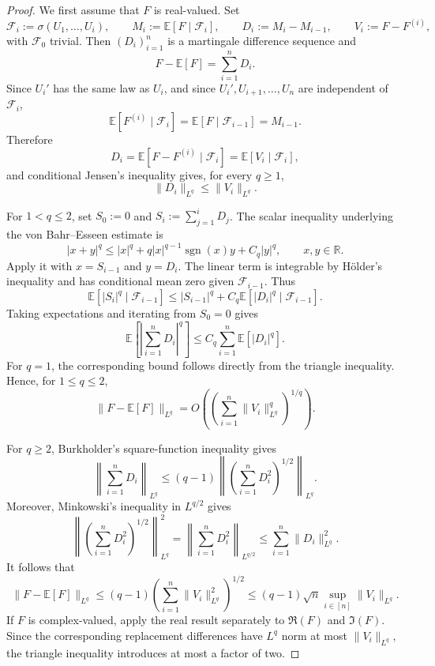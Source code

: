 \documentclass[EJP, preprint, NODS, nobera, nofontexpansion]{ejpecp}
\begin{document}
\begin{proof}
We first assume that $F$ is real-valued. Set
\[
    \mathcal F_i:=\sigma(U_1,\ldots,U_i),
    \qquad
    M_i:=\mathbb E[F\mid\mathcal F_i],
    \qquad
    D_i:=M_i-M_{i-1},
    \qquad
    V_i:=F-F^{(i)},
\]
with $\mathcal F_0$ trivial.  Then $(D_i)_{i=1}^n$ is a martingale
difference sequence and
\[
    F-\mathbb E[F]=\sum_{i=1}^nD_i.
\]
Since $U_i'$ has the same law as $U_i$, and since
$U_i',U_{i+1},\ldots,U_n$ are independent of $\mathcal F_i$,
\[
    \mathbb E[F^{(i)}\mid\mathcal F_i]
    =\mathbb E[F\mid\mathcal F_{i-1}]
    =M_{i-1}.
\]
Therefore
\[
    D_i
    =\mathbb E[F-F^{(i)}\mid\mathcal F_i]
    =\mathbb E[V_i\mid\mathcal F_i],
\]
and conditional Jensen's inequality gives, for every $q\geq1$,
\[
    \|D_i\|_{L^q}\leq\|V_i\|_{L^q}.
\]

For $1<q\leq2$, set $S_0:=0$ and $S_i:=\sum_{j=1}^iD_j$.
The scalar inequality underlying the von Bahr--Esseen estimate
\cite{vonBahr-Esseen-65} is
\[
    |x+y|^q
    \leq |x|^q+q|x|^{q-1}\operatorname{sgn}(x)y+C_q|y|^q,
    \qquad x,y\in\mathbb R.
\]
Apply it with $x=S_{i-1}$ and $y=D_i$. The linear term is integrable by
H\"older's inequality and has conditional mean zero given
$\mathcal F_{i-1}$. Thus
\[
    \mathbb E[|S_i|^q\mid\mathcal F_{i-1}]
    \leq |S_{i-1}|^q
       +C_q\mathbb E[|D_i|^q\mid\mathcal F_{i-1}].
\]
Taking expectations and iterating from $S_0=0$ gives
\[
    \mathbb E\left[\left|\sum_{i=1}^nD_i\right|^q\right]
    \leq C_q\sum_{i=1}^n\mathbb E[|D_i|^q].
\]
For $q=1$, the corresponding bound follows directly from the triangle
inequality. Hence, for $1\leq q\leq2$,
\[
    \|F-\mathbb E[F]\|_{L^q}
    = O\!\left(
      \left(\sum_{i=1}^n\|V_i\|_{L^q}^q\right)^{1/q}
    \right).
\]

For $q\geq2$, Burkholder's square-function inequality
\cite{Burkholder1988Sharp} gives
\[
    \left\|\sum_{i=1}^nD_i\right\|_{L^q}
    \leq(q-1)
    \left\|\left(\sum_{i=1}^nD_i^2\right)^{1/2}\right\|_{L^q}.
\]
Moreover, Minkowski's inequality in $L^{q/2}$ gives
\[
    \left\|\left(\sum_{i=1}^nD_i^2\right)^{1/2}\right\|_{L^q}^2
    =\left\|\sum_{i=1}^nD_i^2\right\|_{L^{q/2}}
    \leq\sum_{i=1}^n\|D_i\|_{L^q}^2.
\]
It follows that
\[
    \|F-\mathbb E[F]\|_{L^q}
    \leq(q-1)
    \left(\sum_{i=1}^n\|V_i\|_{L^q}^2\right)^{1/2}
    \leq(q-1)\sqrt n\sup_{i\in[n]}\|V_i\|_{L^q}.
\]
If $F$ is complex-valued, apply the real result separately to
$\Re(F)$ and $\Im(F)$.  Since the corresponding replacement differences
have $L^q$ norm at most $\|V_i\|_{L^q}$, the triangle inequality
introduces at most a factor of two.
\end{proof}
\end{document}
